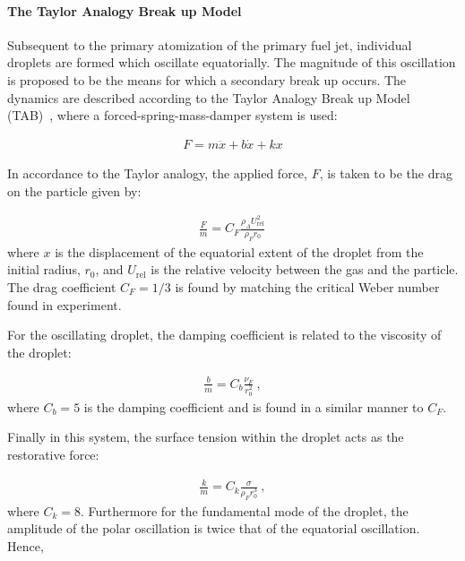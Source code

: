 \paragraph{The Taylor Analogy Break up Model}

Subsequent to the primary atomization of the primary fuel jet, individual droplets are formed which oscillate equatorially. The magnitude of this oscillation is proposed to be the means for which a secondary break up occurs. The dynamics are described according to the Taylor Analogy Break up Model (TAB)~\cite{OROURKE_SAE87}, where a forced-spring-mass-damper system is used:

\begin{equation}
	\begin{aligned}
    	F = m\ddot{x}+b\dot{x}+kx
    \end{aligned}
\end{equation}

In accordance to the Taylor analogy, the applied force, $F$, is taken to be the drag on the particle given by:

\begin{equation}
	\begin{aligned}
    	\frac{F}{m} = C_F\frac{\rho_AU_{\mathrm{rel}}^2}{\rho_F r_0}\,
    \end{aligned}
\end{equation}
where $x$ is the displacement of the equatorial extent of the droplet from the initial radius, $r_0$, and $U_\mathrm{rel}$ is the relative velocity between the gas and the particle. The drag coefficient $C_F=1/3$ is found by matching the critical Weber number found in experiment. 

For the oscillating droplet, the damping coefficient is related to the viscosity of the droplet:

\begin{equation}
	\begin{aligned}
    	\frac{b}{m} = C_b\frac{\nu_F}{r_0^2}\ ,
    \end{aligned}
\end{equation}
where $C_b=5$ is the damping coefficient and is found in a similar manner to $C_F$.

Finally in this system, the surface tension within the droplet acts as the restorative force:

\begin{equation}
	\begin{aligned}
    	\frac{k}{m} = C_k\frac{\sigma}{\rho_F r_0^3}\ ,
    \end{aligned}
\end{equation}
where $C_k=8$. Furthermore for the fundamental mode of the droplet, the amplitude of the polar oscillation is twice that of the equatorial oscillation. Hence,

